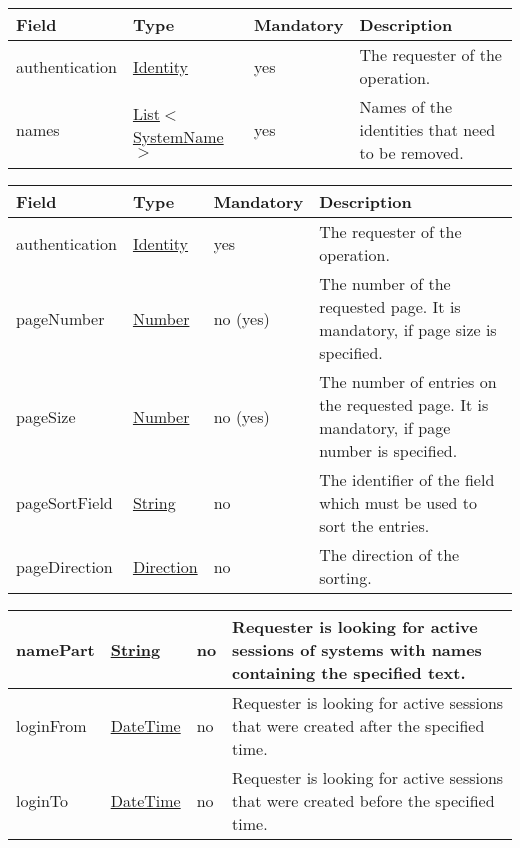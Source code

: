 \documentclass[a4paper]{arrowhead}
\newcommand{\pref}[1]{{\textcolor{ArrowheadGrey}{\hyperref[sec:model:primitives:#1]{#1}}}}
\begin{document}

\begin{table}[ht!]
\begin{tabularx}{\textwidth}{| p{2.5cm} | p{2.5cm} | p{2cm} | X |} \hline
\rowcolor{gray!33} Field & Type & Mandatory & Description \\ \hline
authentication & \hyperref[sec:model:Identity]{Identity} & yes & The requester of the operation. \\ \hline
names &  \pref{List}$<$\pref{SystemName}$>$ & yes & Names of the identities that need to be removed. \\ \hline
\end{tabularx}
\end{table}


\begin{table}[ht!]
\begin{tabularx}{\textwidth}{| p{4.3cm} | p{4.8cm} | p{2cm} | X |} \hline
\rowcolor{gray!33} Field & Type & Mandatory & Description \\ \hline
authentication & \hyperref[sec:model:Identity]{Identity} & yes & The requester of the operation. \\ \hline
pageNumber & \pref{Number} & no (yes) & The number of the requested page. It is mandatory, if page size is specified. \\ \hline
pageSize & \pref{Number} & no (yes) & The number of entries on the requested page. It is mandatory, if page number is specified. \\ \hline
pageSortField & \pref{String} & no & The identifier of the field which must be used to sort the entries. \\ \hline
pageDirection & \pref{Direction} & no & The direction of the sorting. \\ \hline
\end{tabularx}
\end{table}

\begin{table}[ht!]
\begin{tabularx}{\textwidth}{| p{4.3cm} | p{4.8cm} | p{2cm} | X |} \hline
namePart &  \pref{String} & no & Requester is looking for active sessions of systems with names containing the specified text. \\ \hline
loginFrom &  \pref{DateTime} & no & Requester is looking for active sessions that were created after the specified time. \\ \hline
loginTo &  \pref{DateTime} & no & Requester is looking for active sessions that were created before the specified time. \\ \hline
\end{tabularx}
\end{table}
\end{document}

